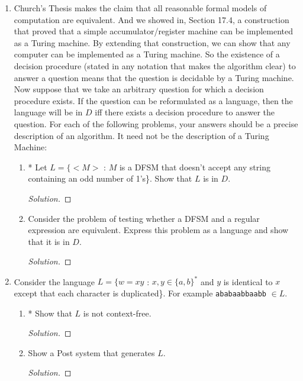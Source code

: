 \documentclass[10pt]{article}
\begin{document}
\begin{enumerate}[1)]
\item
Church’s Thesis makes the claim that all reasonable formal models of computation are equivalent.  And we showed in, Section 17.4, a construction that proved that a simple accumulator/register machine can be implemented as a Turing machine.  By extending that construction, we can show that any computer can be implemented as a Turing machine.  So the existence of a decision procedure (stated in any notation that makes the algorithm clear) to answer a question means that the question is decidable by a Turing machine.  Now suppose that we take an arbitrary question for which a decision procedure exists.  If the question can be reformulated as a language, then the language will be in $D$ iff there exists a decision procedure to answer the question.  For each of the following problems, your answers should be a precise description of an algorithm.  It need not be the description of a Turing Machine:
\begin{enumerate}
\item
* Let $L = \{<M>$ : $M$ is a DFSM that doesn’t accept any string containing an odd number of 1’s\}.  Show that 
$L$ is in $D$.
\begin{proof}[Solution]
\end{proof}

\item
Consider the problem of testing whether a DFSM and a regular expression are equivalent.  Express this problem as a language and show that it is in $D$.
\begin{proof}[Solution]
\end{proof}
\end{enumerate}



\item
Consider the language  $L = \{w = xy$ :  $x, y \in \{a, b\}^*$ and $y$ is identical to $x$ except that each character is 
duplicated\}.  For example \texttt{ababaabbaabb} $\in L$.
\begin{enumerate}
\item
* Show that $L$ is not context-free.
\begin{proof}[Solution]
\end{proof}

\item
Show a Post system that generates $L$.
\begin{proof}[Solution]
\end{proof}
\end{enumerate}



\end{enumerate}
\end{document}
